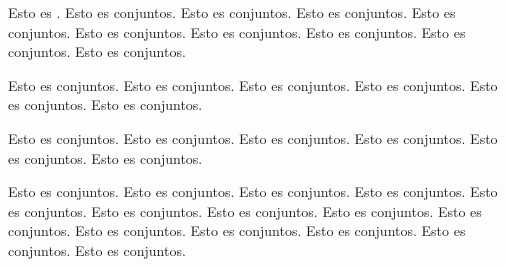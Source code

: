 Esto es . Esto es conjuntos. Esto es conjuntos. Esto es conjuntos. Esto es conjuntos. Esto es conjuntos. Esto es conjuntos. Esto es conjuntos. Esto es conjuntos. Esto es conjuntos. 

Esto es conjuntos. Esto es conjuntos. Esto es conjuntos. Esto es conjuntos. Esto es conjuntos. Esto es conjuntos. 

Esto es conjuntos. Esto es conjuntos. Esto es conjuntos. Esto es conjuntos. Esto es conjuntos. Esto es conjuntos. 

Esto es conjuntos. Esto es conjuntos. Esto es conjuntos. Esto es conjuntos. Esto es conjuntos. Esto es conjuntos. Esto es conjuntos. Esto es conjuntos. Esto es conjuntos. Esto es conjuntos. Esto es conjuntos. Esto es conjuntos. Esto es conjuntos. Esto es conjuntos. 